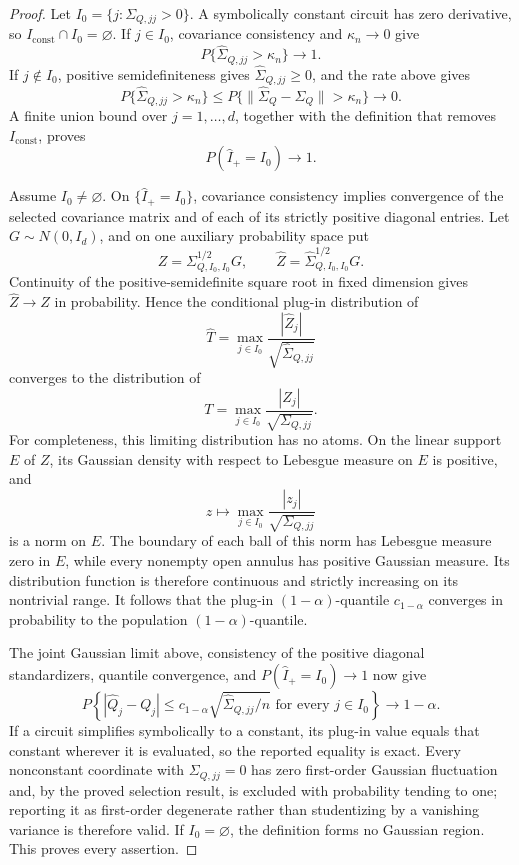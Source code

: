 \documentclass{article}
\begin{document}
\begin{proof}
Let \(I_0=\{j:\Sigma_{Q,jj}>0\}\).  A symbolically constant circuit has zero derivative, so \(I_{\mathrm{const}}\cap I_0=\varnothing\).  If \(j\in I_0\), covariance consistency and \(\kappa_n\to0\) give
\[
 P\{\widehat\Sigma_{Q,jj}>\kappa_n\}\longrightarrow1.
\]
If \(j\notin I_0\), positive semidefiniteness gives \(\widehat\Sigma_{Q,jj}\ge0\), and the rate above gives
\[
 P\{\widehat\Sigma_{Q,jj}>\kappa_n\}
 \le P\{\lVert\widehat\Sigma_Q-\Sigma_Q\rVert>\kappa_n\}
 \longrightarrow0.
\]
A finite union bound over \(j=1,\ldots,d\), together with the definition that removes \(I_{\mathrm{const}}\), proves
\[
 P(\widehat I_+=I_0)\longrightarrow1.
\]

Assume \(I_0\ne\varnothing\).  On \(\{\widehat I_+=I_0\}\), covariance consistency implies convergence of the selected covariance matrix and of each of its strictly positive diagonal entries.  Let \(G\sim N(0,I_d)\), and on one auxiliary probability space put
\[
 Z=\Sigma_{Q,I_0,I_0}^{1/2}G,
 \qquad
 \widehat Z=\widehat\Sigma_{Q,I_0,I_0}^{1/2}G.
\]
Continuity of the positive-semidefinite square root in fixed dimension gives \(\widehat Z\to Z\) in probability.  Hence the conditional plug-in distribution of
\[
 \widehat T=
 \max_{j\in I_0}\frac{|\widehat Z_j|}
 {\sqrt{\widehat\Sigma_{Q,jj}}}
\]
converges to the distribution of
\[
 T=\max_{j\in I_0}\frac{|Z_j|}{\sqrt{\Sigma_{Q,jj}}}.
\]
For completeness, this limiting distribution has no atoms.  On the linear support \(E\) of \(Z\), its Gaussian density with respect to Lebesgue measure on \(E\) is positive, and
\[
 z\longmapsto\max_{j\in I_0}
 \frac{|z_j|}{\sqrt{\Sigma_{Q,jj}}}
\]
is a norm on \(E\).  The boundary of each ball of this norm has Lebesgue measure zero in \(E\), while every nonempty open annulus has positive Gaussian measure.  Its distribution function is therefore continuous and strictly increasing on its nontrivial range.  It follows that the plug-in \((1-\alpha)\)-quantile \(c_{1-\alpha}\) converges in probability to the population \((1-\alpha)\)-quantile.

The joint Gaussian limit above, consistency of the positive diagonal standardizers, quantile convergence, and \(P(\widehat I_+=I_0)\to1\) now give
\[
 P\!\left\{
 |\widehat Q_j-Q_j|
 \le c_{1-\alpha}\sqrt{\widehat\Sigma_{Q,jj}/n}
 \text{ for every }j\in I_0
 \right\}\longrightarrow1-\alpha.
\]
If a circuit simplifies symbolically to a constant, its plug-in value equals that constant wherever it is evaluated, so the reported equality is exact.  Every nonconstant coordinate with \(\Sigma_{Q,jj}=0\) has zero first-order Gaussian fluctuation and, by the proved selection result, is excluded with probability tending to one; reporting it as first-order degenerate rather than studentizing by a vanishing variance is therefore valid.  If \(I_0=\varnothing\), the definition forms no Gaussian region.  This proves every assertion.
\end{proof}
\end{document}
